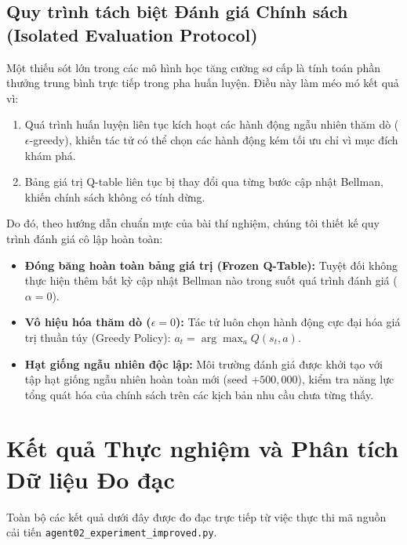 \documentclass[12pt,a4paper]{article}
\begin{document}
\subsection{Quy trình tách biệt Đánh giá Chính sách (Isolated Evaluation Protocol)}
Một thiếu sót lớn trong các mô hình học tăng cường sơ cấp là tính toán phần thưởng trung bình trực tiếp trong pha huấn luyện. Điều này làm méo mó kết quả vì:
\begin{enumerate}
    \item Quá trình huấn luyện liên tục kích hoạt các hành động ngẫu nhiên thăm dò ($\epsilon$-greedy), khiến tác tử có thể chọn các hành động kém tối ưu chỉ vì mục đích khám phá.
    \item Bảng giá trị Q-table liên tục bị thay đổi qua từng bước cập nhật Bellman, khiến chính sách không có tính dừng.
\end{enumerate}
Do đó, theo hướng dẫn chuẩn mực của bài thí nghiệm, chúng tôi thiết kế quy trình đánh giá cô lập hoàn toàn:
\begin{itemize}
    \item \textbf{Đóng băng hoàn toàn bảng giá trị (Frozen Q-Table):} Tuyệt đối không thực hiện thêm bất kỳ cập nhật Bellman nào trong suốt quá trình đánh giá ($\alpha = 0$).
    \item \textbf{Vô hiệu hóa thăm dò ($\epsilon = 0$):} Tác tử luôn chọn hành động cực đại hóa giá trị thuần túy (Greedy Policy): $a_t = \arg\max_a Q(s_t, a)$.
    \item \textbf{Hạt giống ngẫu nhiên độc lập:} Môi trường đánh giá được khởi tạo với tập hạt giống ngẫu nhiên hoàn toàn mới (seed $+ 500,000$), kiểm tra năng lực tổng quát hóa của chính sách trên các kịch bản nhu cầu chưa từng thấy.
\end{itemize}

\section{Kết quả Thực nghiệm và Phân tích Dữ liệu Đo đạc}

Toàn bộ các kết quả dưới đây được đo đạc trực tiếp từ việc thực thi mã nguồn cải tiến \texttt{agent02\_experiment\_improved.py}.
\end{document}
